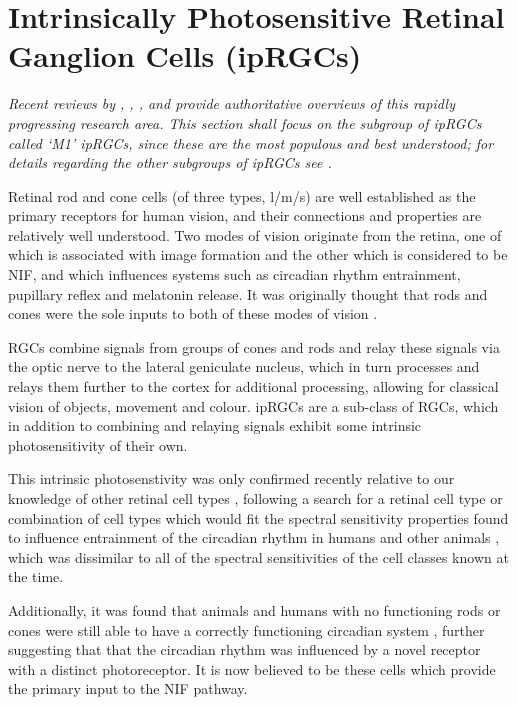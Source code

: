 \section{Intrinsically Photosensitive Retinal Ganglion Cells (ipRGCs)}

\textit{Recent reviews by \citet{spitschan_melanopsin_2019}, \citet{do_melanopsin_2019}, \citet{graham_melanopsin-expressing_2016}, and \citet{lucas_melanopsin_2015} provide authoritative overviews of this rapidly progressing research area. This section shall focus on the subgroup of \glspl{ipRGC} called `M1' \glspl{ipRGC}, since these are the most populous and best understood; for details regarding the other subgroups of \glspl{ipRGC} see \citet{ecker_melanopsin-expressing_2010}.}

\bigskip

Retinal rod and cone cells (of three types, l/m/s) are well established as the primary receptors for human vision, and their connections and properties are relatively well understood. Two modes of vision originate from the retina, one of which is associated with image formation and the other which is considered to be \gls{NIF}, and which influences systems such as circadian rhythm entrainment, pupillary reflex and melatonin release. It was originally thought that rods and cones were the sole inputs to both of these modes of vision \citep{hankins_melanopsin_2008}.

\Glspl{RGC} combine signals from groups of cones and rods and relay these signals via the optic nerve to the lateral geniculate nucleus, which in turn processes and relays them further to the cortex for additional processing, allowing for classical vision of objects, movement and colour. \Glspl{ipRGC} are a sub-class of \glspl{RGC}, which in addition to combining and relaying signals exhibit some intrinsic photosensitivity of their own. 

This intrinsic photosenstivity was only confirmed recently relative to our knowledge of other retinal cell types \citep{qiu_induction_2005}, following a search for a retinal cell type or combination of cell types which would fit the spectral sensitivity properties found to influence entrainment of the circadian rhythm in humans and other animals \citep{brainard_human_2001,brainard_action_2001}, which was dissimilar to all of the spectral sensitivities of the cell classes known at the time.

Additionally, it was found that animals and humans with no functioning rods or cones were still able to have a correctly functioning circadian system \citep{freedman_regulation_1999,zaidi_short-wavelength_2007}, further suggesting that that the circadian rhythm was influenced by a novel receptor with a distinct photoreceptor. It is now believed to be these cells which provide the primary input to the \gls{NIF} pathway.


